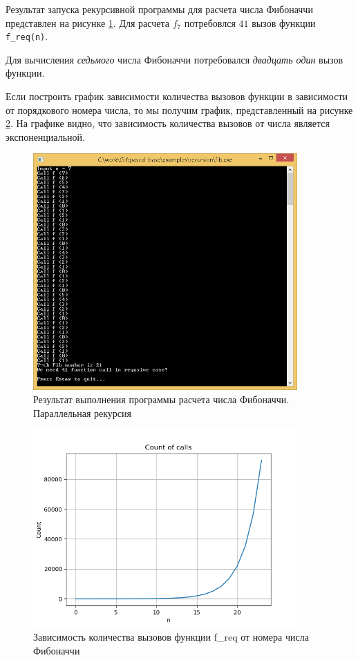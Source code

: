 \documentclass[12pt,a4paper]{article}
\begin{document}
Результат запуска рекурсивной программы для расчета числа Фибоначчи представлен на рисунке \ref{pic03}. Для расчета $f_7$ потребовлся $41$ вызов функции \texttt{f\_req(n)}. 

Для вычисления \textit{седьмого} числа Фибоначчи потребовался \textit{двадцать один} вызов функции. 

Если построить график зависимости количества вызовов функции в зависимости от порядкового номера числа, то мы получим график, представленный на рисунке \ref{pic04}. На графике видно, что зависимость количества вызовов от числа является экспоненциальной. 

\begin{figure}[h!]
	\centering	
	\includegraphics[width=0.9\textwidth]{images/lec14-pic03.png}
	\caption{Результат выполнения программы расчета числа Фибоначчи. Параллельная рекурсия}
	\label{pic03}	
\end{figure}

\begin{figure}[h!]
	\centering	
	\includegraphics[width=0.9\textwidth]{images/lec14-pic04.png}
	\caption{Зависимость количества вызовов функции f\_req от номера числа Фибоначчи}
	\label{pic04}	
\end{figure}
\end{document}
